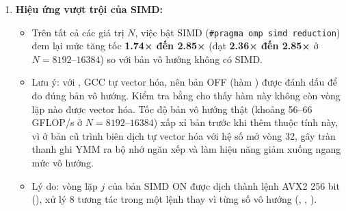 \begin{enumerate}
\item \textbf{Hiệu ứng vượt trội của SIMD:}
\begin{itemize}
\item Trên tất cả các giá trị $N$, việc bật SIMD (\texttt{\#pragma omp simd reduction}) đem lại mức tăng tốc \textbf{1.74× đến 2.85×} (đạt \textbf{2.36× đến 2.85×} ở $N = 8192\text{--}16384$) so với bản vô hướng không có SIMD.
\item Lưu ý: với , GCC tự vector hóa, nên bản OFF (hàm ) được đánh dấu  để đo đúng bản vô hướng. Kiểm tra bằng  cho thấy hàm này không còn vòng lặp nào được vector hóa. Tốc độ bản vô hướng thật (khoảng 56--66 GFLOP/s ở $N = 8192\text{--}16384$) xấp xỉ bản trước khi thêm thuộc tính này, vì ở bản cũ trình biên dịch tự vector hóa với hệ số mở vòng 32, gây tràn thanh ghi YMM ra bộ nhớ ngăn xếp và làm hiệu năng giảm xuống ngang mức vô hướng.
\item Lý do: vòng lặp $j$ của bản SIMD ON được dịch thành lệnh AVX2 256 bit (), xử lý 8 tương tác trong một lệnh thay vì từng số vô hướng (, , ).


\end{itemize}
\end{enumerate}
